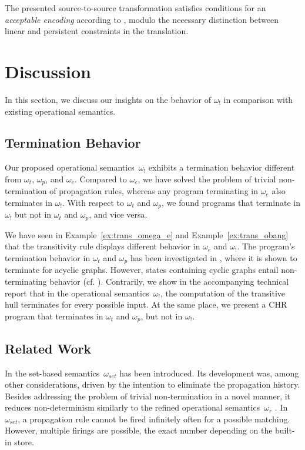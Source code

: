 \documentclass{tlp}
\newcommand{\bang}{\ensuremath{!}}
\newcommand{\obang}{\ensuremath{{\omega_\bang}}}
\newcommand{\oesq}{\ensuremath{{\omega_e}}}
\begin{document}
The presented source-to-source transformation satisfies conditions for an
\emph{acceptable encoding} according to \cite{Gabbrielli2009}, modulo the
necessary distinction between linear and persistent constraints in the
translation.

\section{Discussion}
\label{sec:discussion}

In this section, we discuss our insights on the behavior of $\obang$ in
comparison with existing operational semantics.

\subsection{Termination Behavior}\label{sec:termination}

Our proposed operational
semantics~$\obang$ exhibits a termination behavior different from $\omega_{t}$,
$\omega_p$, and $\oesq$. Compared to $\oesq$, we have solved the problem of
trivial non-termination of propagation rules, whereas any program terminating in
$\oesq$ also terminates in $\obang$. With respect to $\omega_t$ and $\omega_p$,
we found programs that terminate in $\obang$ but not in $\omega_t$ and
$\omega_p$, and vice versa.

We have seen in Example~\ref{ex:trans_omega_e} and Example~\ref{ex:trans_obang}
that the transitivity rule displays different behavior in $\oesq$ and $\obang$.
The program's termination behavior in $\omega_t$ and $\omega_p$ has been
investigated in \cite{Pilozzi2009}, where it is shown to terminate for acyclic
graphs. However, states containing cyclic graphs entail non-terminating behavior
(cf. \cite{Betz2010}). Contrarily, we show in the accompanying
technical report \cite{Betz2010} that in the operational semantics~$\obang$, 
the computation of the transitive hull terminates for every possible input.
At the same place, we present a CHR program that terminates in $\omega_t$ and
$\omega_p$, but not in $\obang$.

\subsection{Related Work}
\label{sec:related_work}

In \cite{Sarna-Starosta2007} the set-based semantics~$\omega_{set}$ has been
introduced. Its development was, among other considerations, driven by the
intention to eliminate the propagation history. Besides addressing the problem of
trivial non-termination in a novel manner, it reduces non-determinism similarly
to the refined operational semantics~$\omega_r$ \cite{Duck2004}. In
$\omega_{set}$, a propagation rule cannot be fired infinitely often for a
possible matching. However, multiple firings are possible, the exact number
depending on the built-in store. 
\end{document}

